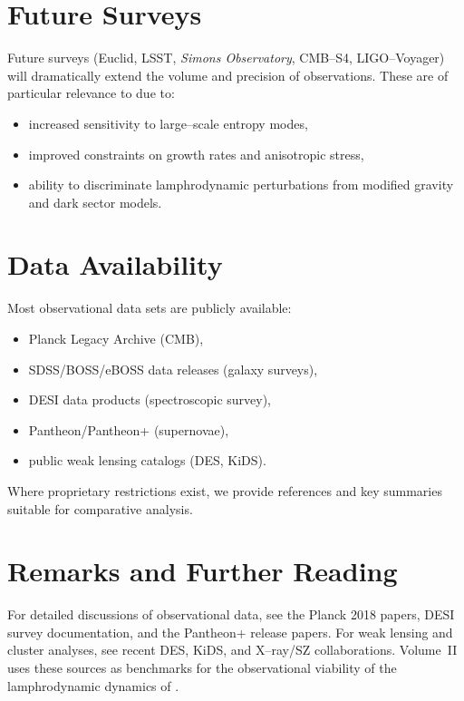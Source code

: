 \section{Future Surveys}

Future surveys (Euclid, LSST, \emph{Simons Observatory}, CMB--S4,
LIGO--Voyager) will dramatically extend the volume and precision of
observations.  These are of particular relevance to \rsvpabbr{} due to:
\begin{itemize}
  \item increased sensitivity to large--scale entropy modes,
  \item improved constraints on growth rates and anisotropic stress,
  \item ability to discriminate lamphrodynamic perturbations from
    modified gravity and dark sector models.
\end{itemize}

\section{Data Availability}

Most observational data sets are publicly available:
\begin{itemize}
  \item Planck Legacy Archive (CMB),
  \item SDSS/BOSS/eBOSS data releases (galaxy surveys),
  \item DESI data products (spectroscopic survey),
  \item Pantheon/Pantheon+ (supernovae),
  \item public weak lensing catalogs (DES, KiDS).
\end{itemize}
Where proprietary restrictions exist, we provide references and key
summaries suitable for comparative analysis.

\section{Remarks and Further Reading}

For detailed discussions of observational data, see the Planck 2018
papers, DESI survey documentation, and the Pantheon+ release papers.
For weak lensing and cluster analyses, see recent DES, KiDS, and
X--ray/SZ collaborations.  Volume~II uses these sources as benchmarks
for the observational viability of the lamphrodynamic dynamics of
\rsvpabbr{}.

